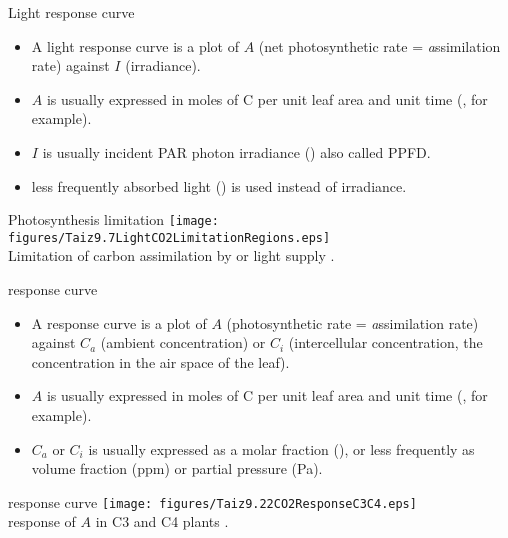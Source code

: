 \documentclass[10pt]{beamer}
\begin{document}
\begin{frame}{Light response curve}
    \begin{itemize}
        \item A light response curve is a plot of $A$
        (net photosynthetic rate = \emph{a}ssimilation rate) against
        $I$ (irradiance).%
        \item $A$ is usually expressed in moles of C per unit leaf
        area and unit time (\umol, for example).%
        \item $I$ is usually incident PAR photon irradiance (\umol) also called PPFD.
        \item less frequently absorbed light (\umol) is used instead of irradiance.
    \end{itemize}
\end{frame}

\begin{frame}{Photosynthesis limitation}
    \centering
    \texttt{[image: figures/Taiz9.7LightCO2LimitationRegions.eps]}\\
    {\footnotesize Limitation of carbon assimilation by \COtwo or light
    supply
    \autocite[from][]{TaiZei2006}.}
\end{frame}

\begin{frame}{\COtwo response curve}
    \begin{itemize}
        \item A \COtwo response curve is a plot of $A$
        (photosynthetic rate = \emph{a}ssimilation rate) against
        $C_a$ (ambient \COtwo concentration) or $C_i$ (intercellular
        \COtwo concentration, the concentration in the air space of the leaf).
        \item $A$ is usually expressed in moles of C per unit leaf
        area and unit time (\umol, for example).%
        \item $C_a$ or $C_i$ is usually expressed as a molar fraction (\ppm), or less
        frequently as volume fraction (ppm) or partial pressure (Pa).
    \end{itemize}
\end{frame}

\begin{frame}{\COtwo response curve}
    \centering
    \texttt{[image: figures/Taiz9.22CO2ResponseC3C4.eps]}\\
    {\footnotesize \COtwo response of $A$ in C3 and C4 plants
    \autocite[from][]{TaiZei2006}.}
\end{frame}
\end{document}
